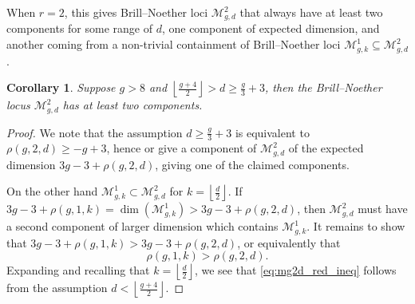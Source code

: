 \documentclass[11pt]{amsart}
\newcommand{\BN}[3]{\mathcal{M}^{#2}_{#1,#3}}
\newcommand{\floor}[1]{\left\lfloor #1 \right\rfloor}
\newtheorem{cor}[theorem]{Corollary}
\theoremstyle{definition}
\theoremstyle{definition}
\newtheorem{example}[theorem]{Example}
\begin{document}
When $r=2$, this gives Brill--Noether loci $\BN{g}{2}{d}$ that always have at least two components for some range of $d$, one component of expected dimension, and another coming from a non-trivial containment of Brill--Noether loci $\BN{g}{1}{k}\subseteq \BN{g}{2}{d}$.

\begin{cor}
	Suppose $g>8$ and $\floor{\frac{g+4}{2}}>d\geq \frac{g}{3}+3$, then the Brill--Noether locus $\BN{g}{2}{d}$ has at least two components.
\end{cor}
\begin{proof}
We note that the assumption $d\geq \frac{g}{3}+3$ is equivalent to $\rho(g,2,d)\geq -g+3$, hence \cite[Theorem A]{pflueger_lego} or \cite[Theorem 2.1]{DBN}
 give a component of $\BN{g}{2}{d}$ of the expected dimension $3g-3+\rho(g,2,d)$, giving one of the claimed components.

On the other hand  $\BN{g}{1}{k}\subset \BN{g}{2}{d}$ for $k=\floor{\frac{d}{2}}$. 
If $3g-3+\rho(g,1,k)=\dim(\BN{g}{1}{k})>3g-3+\rho(g,2,d)$, then $\BN{g}{2}{d}$ must have a second component of larger dimension which contains $\BN{g}{1}{k}$.
It remains to show that $3g-3+\rho(g,1,k)>3g-3+\rho(g,2,d)$, or equivalently that 
	\begin{equation}
		\rho(g,1,k)>\rho(g,2,d). \label{eq:mg2d_red_ineq}
	\end{equation} 
Expanding and recalling that $k=\floor{\frac{d}{2}}$, we see that \eqref{eq:mg2d_red_ineq} follows from the assumption $d<\floor{\frac{g+4}2}$.
\end{proof}



\end{document}
